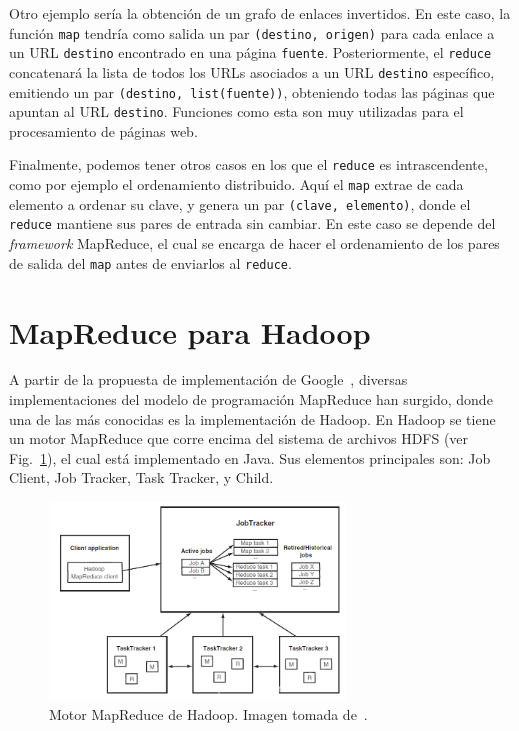 \documentclass[conference]{IEEEtran}
\begin{document}
Otro ejemplo sería la obtención de un grafo de enlaces invertidos.
En este caso, la función \texttt{map} tendría como salida un par \texttt{(destino, origen)} para cada enlace a un URL \texttt{destino} encontrado en una página \texttt{fuente}.
Posteriormente, el \texttt{reduce} concatenará la lista de todos los URLs asociados a un URL \texttt{destino} específico, emitiendo un par \texttt{(destino, list(fuente))}, obteniendo todas las páginas que apuntan al URL \texttt{destino}.
Funciones como esta son muy utilizadas para el procesamiento de páginas web.


Finalmente, podemos tener otros casos en los que el \texttt{reduce} es intrascendente, como por ejemplo el ordenamiento distribuido.
Aquí el \texttt{map} extrae de cada elemento a ordenar su clave, y genera un par \texttt{(clave, elemento)}, donde el \texttt{reduce} mantiene sus pares de entrada sin cambiar.
En este caso se depende del \textit{framework} MapReduce, el cual se encarga de hacer el ordenamiento de los pares de salida del \texttt{map} antes de enviarlos al \texttt{reduce}.





\section{MapReduce para Hadoop}
\label{hadoop}


A partir de la propuesta de implementación de Google~\cite{MapReduce04}, diversas implementaciones del modelo de programación MapReduce han surgido, donde una de las más conocidas es la implementación de Hadoop.
En Hadoop se tiene un motor MapReduce que corre encima del sistema de archivos HDFS (ver Fig.~\ref{motor}), el cual está implementado en Java.
Sus elementos principales son: Job Client,  Job Tracker, Task Tracker, y Child.


\begin{figure}[htbp!]
\centering
\includegraphics[width=0.7\textwidth]{images/motor.png}
\caption{Motor MapReduce de Hadoop. Imagen tomada de~\cite{Holmes12}.}
\label{motor}
\end{figure}
	
\end{document}
